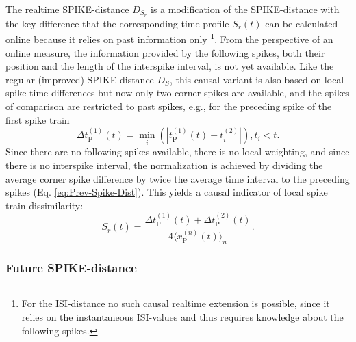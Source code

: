 \documentclass[10pt,twocolumn]{elsart5p}
\begin{document}
\begin{appendix}
The realtime SPIKE-distance $D_{S_r}$ is a modification of the SPIKE-distance with the key difference that the corresponding time profile $S_r(t)$ can be calculated online because it relies on past information only \footnote{For the ISI-distance no such causal realtime extension is possible, since it relies on the instantaneous ISI-values and thus requires knowledge about the following spikes.}. From the perspective of an online measure, the information provided by the following spikes, both their position and the length of the interspike interval, is not yet available. Like the regular (improved) SPIKE-distance $D_S$, this causal variant is also based on local spike time differences but now only two corner spikes are available, and the spikes of comparison are restricted to past spikes, e.g., for the preceding spike of the first spike train
%
\begin{equation} \label{eq:Delta-Corner-Spike-Realtime}
     \Delta t_{\mathrm {P}}^{(1)} (t) = \min_i (| t_{\mathrm {P}}^{(1)} (t) - t_i^{(2)} |), t_i < t.
\end{equation}
%
Since there are no following spikes available, there is no local weighting, and since there is no interspike interval, the normalization is achieved by dividing the average corner spike difference by twice the average time interval to the preceding spikes (Eq. \ref{eq:Prev-Spike-Dist}). This yields a causal indicator of local spike train dissimilarity:
%
\begin{equation} \label{eq:Bi-Spike-Diss-RT}
    S_r (t) = \frac{ \Delta t_{\mathrm {P}}^{(1)} (t) + \Delta t_{\mathrm {P}}^{(2)} (t)} {4 \langle x_{\mathrm {P}}^{(n)} (t) \rangle_n}.
\end{equation}


\subsubsection{\label{App-sss:Future-Spike-Distance} Future SPIKE-distance}


\end{appendix}
\end{document}
